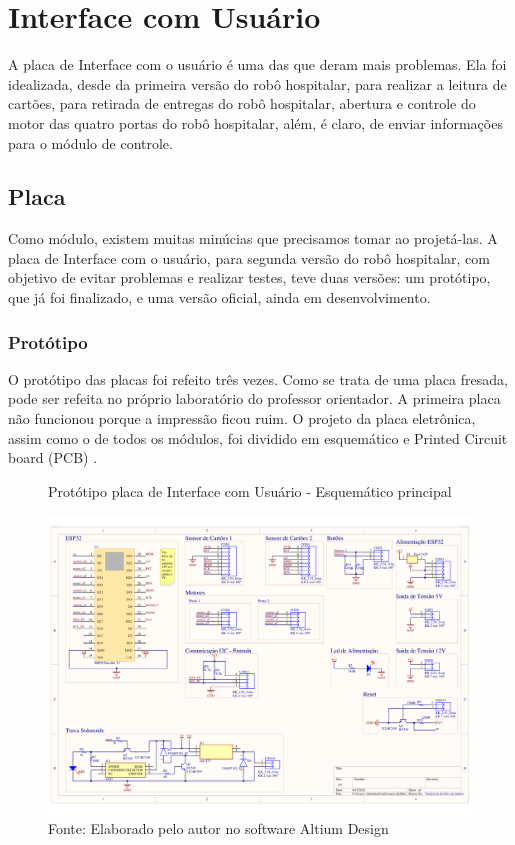 \documentclass[../delivery_hospital_report.tex]{subfiles}
\begin{document}
\clearpage

\section{Interface com Usuário}

A placa de Interface com o usuário é uma das que deram mais problemas. Ela foi idealizada, desde da primeira versão do robô hospitalar, para realizar a leitura de cartões, para retirada de entregas do robô hospitalar, abertura e controle do motor das quatro portas do robô hospitalar, além, é claro, de enviar informações para o módulo de controle.

\subsection{Placa}

Como módulo, existem muitas minúcias que precisamos tomar ao projetá-las. A placa de Interface com o usuário, para segunda versão do robô hospitalar, com objetivo de evitar problemas e realizar testes, teve duas versões: um protótipo, que já foi finalizado, e uma versão oficial, ainda em desenvolvimento. 

\subsubsection{Protótipo}

O protótipo das placas foi refeito três vezes. Como se trata de uma placa fresada, pode ser refeita no próprio laboratório do professor orientador. A primeira placa não funcionou porque a impressão ficou ruim. O projeto da placa eletrônica, assim como o de todos os módulos, foi dividido em esquemático e Printed Circuit board (PCB) . 

\begin{figure}[!ht]
\centering
    \caption{Protótipo placa de Interface com Usuário - Esquemático principal }
    \centering %
    \includegraphics[width=15cm]{modulos/InterfaceComUsuario-1.png}
    \caption*{Fonte: Elaborado pelo autor no software Altium Design\cite{altium21} }
    \label{Protótipo placa de ## - Esquemático principal}
\end{figure}
\end{document}
